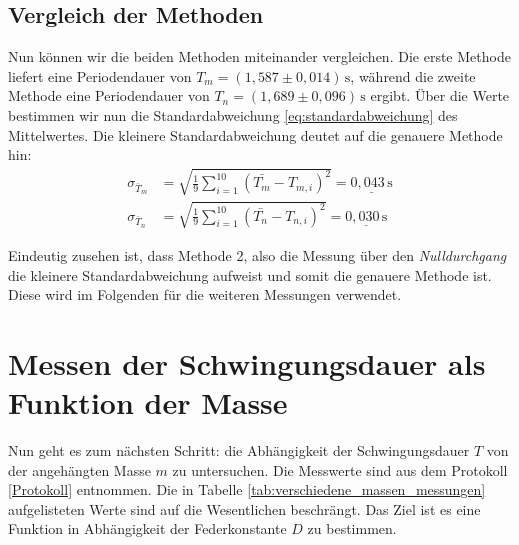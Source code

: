 \subsection*{Vergleich der Methoden}
Nun können wir die beiden Methoden miteinander vergleichen. Die erste Methode liefert eine Periodendauer von $T_{m} = (1,587 \pm 0,014)\,\mathrm{s}$, während die zweite Methode eine Periodendauer von $T_{n} = (1,689 \pm 0,096)\,\mathrm{s}$ ergibt.
Über die Werte bestimmen wir nun die Standardabweichung \eqref{eq:standardabweichung} des Mittelwertes. Die kleinere Standardabweichung deutet auf die genauere Methode hin:
\begin{align}
    \sigma_{\bar{T}_m} &= \sqrt{\frac{1}{9} \sum_{i=1}^{10} (\bar{T_m}-T_{m,i})^2} = \underline{0,043\,\mathrm{s}} \\
    \sigma_{\bar{T}_n} &= \sqrt{\frac{1}{9} \sum_{i=1}^{10} (\bar{T_n}-T_{n,i})^2} = \underline{0,030\,\mathrm{s}}
\end{align}

Eindeutig zusehen ist, dass Methode 2, also die Messung über den \emph{Nulldurchgang} die kleinere Standardabweichung aufweist und somit die genauere Methode ist. Diese wird im Folgenden für die weiteren Messungen verwendet.

\section{Messen der Schwingungsdauer als Funktion der Masse}
Nun geht es zum nächsten Schritt: die Abhängigkeit der Schwingungsdauer $T$ von der angehängten Masse $m$ zu untersuchen. Die Messwerte sind aus dem Protokoll \ref{Protokoll} entnommen. Die in Tabelle \ref{tab:verschiedene_massen_messungen} aufgelisteten Werte sind auf die Wesentlichen beschrängt.
Das Ziel ist es eine Funktion in Abhängigkeit der Federkonstante $D$ zu bestimmen.

